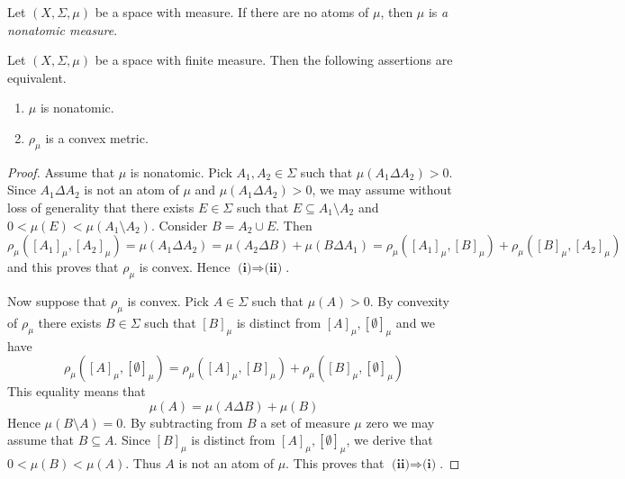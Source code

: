 \begin{definition}
  Let $(X,\Sigma,\mu)$ be a space with measure. If there are no atoms of $\mu$, then $\mu$ is \textit{a nonatomic measure}.
\end{definition}

\begin{theorem}\label{theorem:finite_measure_is_nonatomic_if_and_only_if_the_induced_metric_is_convex}
  Let $(X,\Sigma,\mu)$ be a space with finite measure. Then the following assertions are equivalent.
  \begin{enumerate}[label=\emph{\textbf{(\roman*)}}, leftmargin=*]
    \item $\mu$ is nonatomic.
    \item $\rho_{\mu}$ is a convex metric.
  \end{enumerate}
\end{theorem}
\begin{proof}
  Assume that $\mu$ is nonatomic. Pick $A_1,A_2 \in \Sigma$ such that $\mu(A_1\Delta A_2) > 0$. Since $A_1 \Delta A_2$ is not an atom of $\mu$ and $\mu(A_1\Delta A_2) > 0$, we may assume without loss of generality that there exists $E \in \Sigma$ such that $E \subseteq A_1 \setminus A_2$ and $0 < \mu(E) < \mu(A_1\setminus A_2)$. Consider $B = A_2 \cup E$. Then 
  $$\rho_{\mu}\left([A_1]_{\mu},[A_2]_{\mu}\right) = \mu\left(A_1\Delta A_2\right) = \mu(A_2\Delta B) + \mu(B\Delta A_1) = \rho_{\mu}\left([A_1]_{\mu},[B]_{\mu}\right) + \rho_{\mu}\left([B]_{\mu},[A_2]_{\mu}\right)$$
  and this proves that $\rho_{\mu}$ is convex. Hence $\textbf{(i)}\Rightarrow \textbf{(ii)}$.

  Now suppose that $\rho_{\mu}$ is convex. Pick $A \in \Sigma$ such that $\mu(A) > 0$. By convexity of $\rho_{\mu}$ there exists $B \in \Sigma$ such that $[B]_{\mu}$ is distinct from $[A]_{\mu}, [\emptyset]_{\mu}$ and we have 
  $$\rho_{\mu}\left([A]_{\mu}, [\emptyset]_{\mu}\right) = \rho_{\mu}\left([A]_{\mu},[B]_{\mu}\right) + \rho_{\mu}\left([B]_{\mu},[\emptyset]_{\mu}\right)$$
  This equality means that
  $$\mu(A) = \mu(A\Delta B) + \mu(B)$$
  Hence $\mu(B \setminus A) = 0$. By subtracting from $B$ a set of measure $\mu$ zero we may assume that $B \subseteq A$. Since $[B]_{\mu}$ is distinct from $[A]_{\mu}, [\emptyset]_{\mu}$, we derive that $0 < \mu(B) < \mu(A)$. Thus $A$ is not an atom of $\mu$. This proves that $\textbf{(ii)}\Rightarrow \textbf{(i)}$.
\end{proof}

